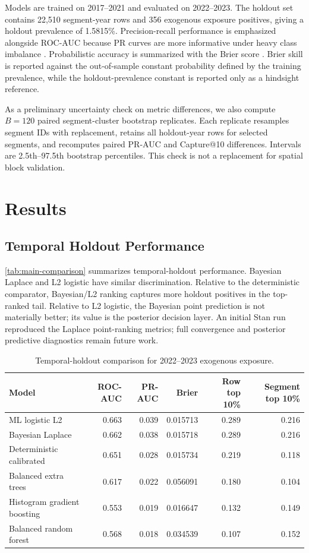 \documentclass[11pt]{article}
\begin{document}
Models are trained on 2017--2021 and evaluated on 2022--2023. The holdout set
contains 22,510 segment-year rows and 356 exogenous exposure positives, giving
a holdout prevalence of 1.5815\%. Precision-recall performance is emphasized
alongside ROC-AUC because PR curves are more informative under heavy class
imbalance \citep{saitoRehmsmeier2015pr}. Probabilistic accuracy is summarized
with the Brier score \citep{brier1950verification}. Brier skill is reported
against the out-of-sample constant probability defined by the training
prevalence, while the holdout-prevalence constant is reported only as a
hindsight reference.

As a preliminary uncertainty check on metric differences, we also compute
$B=120$ paired segment-cluster bootstrap replicates. Each replicate resamples
segment IDs with replacement, retains all holdout-year rows for selected
segments, and recomputes paired PR-AUC and Capture@10 differences. Intervals
are 2.5th--97.5th bootstrap percentiles. This check is not a replacement for
spatial block validation.

\section{Results}

\subsection{Temporal Holdout Performance}

\autoref{tab:main-comparison} summarizes temporal-holdout performance. Bayesian
Laplace and L2 logistic have similar discrimination. Relative to the
deterministic comparator, Bayesian/L2 ranking captures more holdout positives
in the top-ranked tail. Relative to L2 logistic, the Bayesian point prediction
is not materially better; its value is the posterior decision layer. An initial
Stan run reproduced the Laplace point-ranking metrics; full convergence and
posterior predictive diagnostics remain future work.

\begin{table}[!htbp]
  \centering
  \small
  \caption{Temporal-holdout comparison for 2022--2023 exogenous exposure.}
  \label{tab:main-comparison}
  \begin{tabular}{lrrrrr}
    \toprule
    Model & ROC-AUC & PR-AUC & Brier & Row top 10\% & Segment top 10\% \\
    \midrule
    ML logistic L2 & 0.663 & 0.039 & 0.015713 & 0.289 & 0.216 \\
    Bayesian Laplace & 0.662 & 0.038 & 0.015718 & 0.289 & 0.216 \\
    Deterministic calibrated & 0.651 & 0.028 & 0.015734 & 0.219 & 0.118 \\
    Balanced extra trees & 0.617 & 0.022 & 0.056091 & 0.180 & 0.104 \\
    Histogram gradient boosting & 0.553 & 0.019 & 0.016647 & 0.132 & 0.149 \\
    Balanced random forest & 0.568 & 0.018 & 0.034539 & 0.107 & 0.152 \\
    \bottomrule
  \end{tabular}
\end{table}
\end{document}
